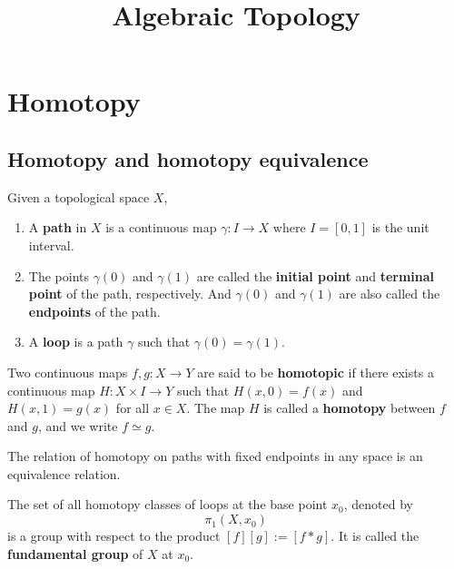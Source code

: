 \documentclass[12pt, oneside]{book}
\begin{document}
\frontmatter
\title{{\Huge{\textbf{Algebraic Topology}}}}
\maketitle
{}
\tableofcontents %


\mainmatter

\chapter{Homotopy}

\section{Homotopy and homotopy equivalence}

\begin{definition}
    Given a topological space $X$,
    \begin{enumerate}
        \item
              A \textbf{path} in $X$ is a continuous map $\gamma: I \to X$ where $I = [0,1]$ is the unit interval.
        \item
              The points $\gamma(0)$ and $\gamma(1)$ are called the \textbf{initial point} and \textbf{terminal point} of the path, respectively. And $\gamma(0)$ and $\gamma(1)$ are also called the \textbf{endpoints} of the path.
        \item
              A \textbf{loop} is a path $\gamma$ such that $\gamma(0) = \gamma(1)$.
    \end{enumerate}
\end{definition}

\begin{definition}
    Two continuous maps $f,g: X \to Y$ are said to be \textbf{homotopic} if there exists a continuous map $H: X \times I \to Y$ such that $H(x,0) = f(x)$ and $H(x,1) = g(x)$ for all $x \in X$. The map $H$ is called a \textbf{homotopy} between $f$ and $g$, and we write $f \simeq g$.
    \begin{remark}
        The relation of homotopy on paths with fixed endpoints in any space
        is an equivalence relation.
    \end{remark}
\end{definition}


\begin{definition}
    The set of all homotopy classes of loops at the base point $x_0$, denoted by
    \begin{equation*}
        \pi_1(X,x_0)
    \end{equation*}
    is a group with respect to the product $[f][g]:=\left[f * g\right]$. It is called the \textbf{fundamental group} of $X$ at $x_0$.
\end{definition}
\end{document}
